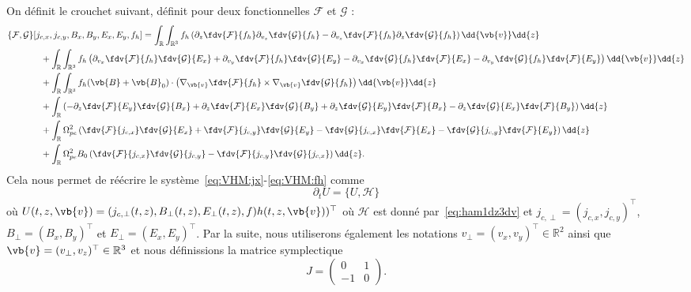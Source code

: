 On définit le crouchet suivant, définit pour deux fonctionnelles $\mathcal{F}$ et $\mathcal{G}$ :
\begin{equation}
  \begin{aligned}
    \{ \mathcal{F},\mathcal{G} \}[ j_{c,x}, j_{c,y}, B_x, B_y, E_x, E_y, f_h] &=
                       \int_{\mathbb{R}}\int_{\mathbb{R}^3} f_h \left( \partial_z\fdv{\mathcal{F}}{f_h}\partial_{v_z}\fdv{\mathcal{G}}{f_h} - \partial_{v_z}\fdv{\mathcal{F}}{f_h}\partial_z\fdv{\mathcal{G}}{f_h} \right) \dd{\vb{v}}\dd{z} \\
      &\hspace{-4cm} + \int_{\mathbb{R}}\int_{\mathbb{R}^3} f_h \left(
            \partial_{v_x}\fdv{\mathcal{F}}{f_h}\fdv{\mathcal{G}}{E_x} + \partial_{v_y}\fdv{\mathcal{F}}{f_h}\fdv{\mathcal{G}}{E_y}
          - \partial_{v_x}\fdv{\mathcal{G}}{f_h}\fdv{\mathcal{F}}{E_x} - \partial_{v_y}\fdv{\mathcal{G}}{f_h}\fdv{\mathcal{F}}{E_y}
          \right) \dd{\vb{v}}\dd{z} \\
      &\hspace{-4cm} + \int_{\mathbb{R}}\int_{\mathbb{R}^3} f_h(\vb{B}+\vb{B}_0)\cdot\left( \nabla_{\vb{v}}\fdv{\mathcal{F}}{f_h}\times\nabla_{\vb{v}}\fdv{\mathcal{G}}{f_h} \right) \dd{\vb{v}}\dd{z} \\
      &\hspace{-4cm} + \int_{\mathbb{R}} \left(
          - \partial_z\fdv{\mathcal{F}}{E_y}\fdv{\mathcal{G}}{B_x} + \partial_z\fdv{\mathcal{F}}{E_x}\fdv{\mathcal{G}}{B_y}
          + \partial_z\fdv{\mathcal{G}}{E_y}\fdv{\mathcal{F}}{B_x} - \partial_z\fdv{\mathcal{G}}{E_x}\fdv{\mathcal{F}}{B_y}
          \right) \dd{z} \\
      &\hspace{-4cm} + \int_{\mathbb{R}} \Omega_{pe}^2 \left(
            \fdv{\mathcal{F}}{j_{c,x}}\fdv{\mathcal{G}}{E_x} + \fdv{\mathcal{F}}{j_{c,y}}\fdv{\mathcal{G}}{E_y}
          - \fdv{\mathcal{G}}{j_{c,x}}\fdv{\mathcal{F}}{E_x} - \fdv{\mathcal{G}}{j_{c,y}}\fdv{\mathcal{F}}{E_y}
          \right) \dd{z} \\
      &\hspace{-4cm} + \int_{\mathbb{R}} \Omega_{pe}^2B_0 \left(
            \fdv{\mathcal{F}}{j_{c,x}}\fdv{\mathcal{G}}{j_{c,y}}
          - \fdv{\mathcal{F}}{j_{c,y}}\fdv{\mathcal{G}}{j_{c,x}}
          \right) \dd{z}.
  \end{aligned}
  \label{bracket}
\end{equation}
Cela nous permet de réécrire le système~\eqref{eq:VHM:jx}-\eqref{eq:VHM:fh} comme 
$$
  \partial_t U = \{ U,\mathcal{H} \}
$$
où $U(t,z,\vb{v}) = ( j_{c,\perp}(t,z) , B_\perp(t,z) , E_\perp(t,z) , f)h(t,z,\vb{v}) )^\top$ où $\mathcal{H}$ est donné par~\eqref{eq:ham1dz3dv} et $j_{c,\perp}=(j_{c,x},j_{c,y})^\top$, $B_{\perp}=(B_{x},B_{y})^\top$ et $E_{\perp}=(E_{x},E_{y})^\top$. Par la suite, nous utiliserons également les notations $v_\perp = (v_x,v_y)^\top\in\mathbb{R}^2$ ainsi que $\vb{v} = (v_\perp,v_z)^\top\in\mathbb{R}^3$ et nous définissions la matrice symplectique 
$$
  J = \begin{pmatrix}
     0 & 1 \\
    -1 & 0
  \end{pmatrix}.
$$
